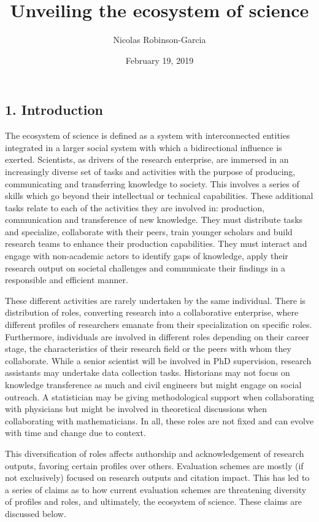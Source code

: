 \documentclass[]{article}
\title{Unveiling the ecosystem of science}
\author{Nicolas Robinson-Garcia}
\date{February 19, 2019}
\begin{document}
\maketitle

\subsection{1. Introduction}\label{introduction}

The ecosystem of science is defined as a system with interconnected
entities integrated in a larger social system with which a bidirectional
influence is exerted. Scientists, as drivers of the research enterprise,
are immersed in an increasingly diverse set of tasks and activities with
the purpose of producing, communicating and transferring knowledge to
society. This involves a series of skills which go beyond their
intellectual or technical capabilities. These additional tasks relate to
each of the activities they are involved in: production, communication
and transference of new knowledge. They must distribute tasks and
specialize, collaborate with their peers, train younger scholars and
build research teams to enhance their production capabilities. They must
interact and engage with non-academic actors to identify gaps of
knowledge, apply their research output on societal challenges and
communicate their findings in a responsible and efficient manner.

These different activities are rarely undertaken by the same individual.
There is distribution of roles, converting research into a collaborative
enterprise, where different profiles of researchers emanate from their
specialization on specific roles. Furthermore, individuals are involved
in different roles depending on their career stage, the characteristics
of their research field or the peers with whom they collaborate. While a
senior scientist will be involved in PhD supervision, research
assistants may undertake data collection tasks. Historians may not focus
on knowledge transference as much and civil engineers but might engage
on social outreach. A statistician may be giving methodological support
when collaborating with physicians but might be involved in theoretical
discussions when collaborating with mathematicians. In all, these roles
are not fixed and can evolve with time and change due to context.

This diversification of roles affects authorship and acknowledgement of
research outputs, favoring certain profiles over others. Evaluation
schemes are mostly (if not exclusively) focused on research outputs and
citation impact. This has led to a series of claims as to how current
evaluation schemes are threatening diversity of profiles and roles, and
ultimately, the ecosystem of science. These claims are discussed below.
\end{document}
